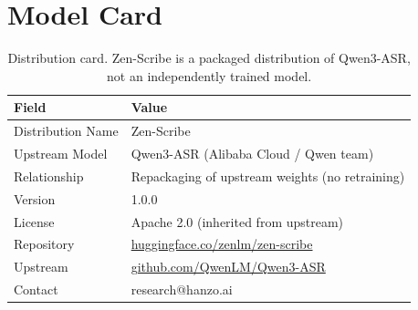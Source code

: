 \documentclass[11pt,a4paper]{article}
\begin{document}
\appendix

\section{Model Card}

\begin{table}[H]
\centering
\begin{tabular}{ll}
\toprule
\textbf{Field} & \textbf{Value} \\
\midrule
Distribution Name & Zen-Scribe \\
Upstream Model & Qwen3-ASR (Alibaba Cloud / Qwen team) \\
Relationship & Repackaging of upstream weights (no retraining) \\
Version & 1.0.0 \\
License & Apache 2.0 (inherited from upstream) \\
Repository & \href{https://huggingface.co/zenlm/zen-scribe}{huggingface.co/zenlm/zen-scribe} \\
Upstream & \href{https://github.com/QwenLM/Qwen3-ASR}{github.com/QwenLM/Qwen3-ASR} \\
Contact & research@hanzo.ai \\
\bottomrule
\end{tabular}
\caption{Distribution card. Zen-Scribe is a packaged distribution of Qwen3-ASR, not an
independently trained model.}
\end{table}
\end{document}
